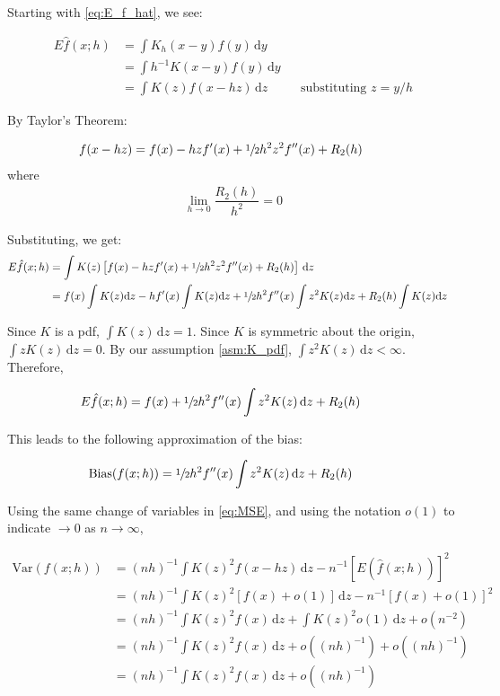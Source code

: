 Starting with \autoref{eq:E_f_hat}, we see:

\begin{align}
E\hat{f}(x;h) & = \int{K_h(x - y)f(y)\,\mathrm{d}y} && \nonumber \\
    & = \int{h^{-1}K(x-y)f(y)\,\mathrm{d}y} && \nonumber \\
    & = \int{K(z)f(x-hz)\,\mathrm{d}z} && \text{substituting } z=y/h
\end{align}

By Taylor's Theorem:

\begin{align}
f(x-hz) & = f(x) - hzf^\prime(x) + \sfrac{1}{2}h^2z^2f^{\prime\prime}(x) + R_2(h) && \nonumber
\end{align}
where
\begin{align}
\lim_{h \to 0} \dfrac{R_2(h)}{h^2} = 0
\end{align}

Substituting, we get:
\begin{align}
E\hat{f}(x;h) & = \int{K(z) \left[ f(x) - hzf^\prime(x) + \sfrac{1}{2}h^2z^2f^{\prime\prime}(x) + R_2(h) \right] \,\mathrm{d}z} && \nonumber \\
    & = f(x)\int{K(z)\mathrm{d}z} - hf^\prime(x)\int{K(z)\mathrm{d}z} + \sfrac{1}{2}h^2f^{\prime\prime}(x)\int{z^2K(z)\mathrm{d}z} + R_2(h)\int{K(z)\mathrm{d}z} && \nonumber
\end{align}


Since $K$ is a pdf, $\int{K(z)\,\mathrm{d}z}=1$.
Since $K$ is symmetric about the origin, $\int{zK(z)\,\mathrm{d}z}=0$.
By our assumption \ref{asm:K_pdf}, $\int{z^2K(z)\,\mathrm{d}z} < \infty$.
Therefore,

\begin{align}
E\hat{f}(x;h) & = f(x) + \sfrac{1}{2}h^2f^{\prime\prime}(x)\int{z^2K(z)\,\mathrm{d}z} + R_2(h) && \nonumber
\end{align}

This leads to the following approximation of the bias:

\begin{align}
\mbox{Bias}(f(x;h)) & = \sfrac{1}{2}h^2f^{\prime\prime}(x)\int{z^2K(z)\,\mathrm{d}z} + R_2(h) && \label{eq:ABias}
\end{align}

Using the same change of variables in \autoref{eq:MSE}, and using the notation $o(1)$ to indicate $\to 0$ as $n \to \infty$,

\begin{align}
\mbox{Var}(f(x;h)) & = (nh)^{-1} \int{K(z)^2f(x - hz)\,\mathrm{d}z} - n^{-1} [E(\hat{f}(x;h))]^2 && \nonumber \\
    & = (nh)^{-1} \int{K(z)^2[f(x) + o(1)]\,\mathrm{d}z} - n^{-1}[f(x) + o(1)]^2 && \nonumber \\
    & = (nh)^{-1} \int{K(z)^2f(x)\,\mathrm{d}z} + \int{K(z)^2o(1)\,\mathrm{d}z} + o(n^{-2})  && \nonumber \\
    & = (nh)^{-1} \int{K(z)^2f(x)\,\mathrm{d}z} + o((nh)^{-1}) + o((nh)^{-1}) && \nonumber \\
    & = (nh)^{-1} \int{K(z)^2f(x)\,\mathrm{d}z} + o((nh)^{-1}) && \label{eq:AVar}
\end{align}

